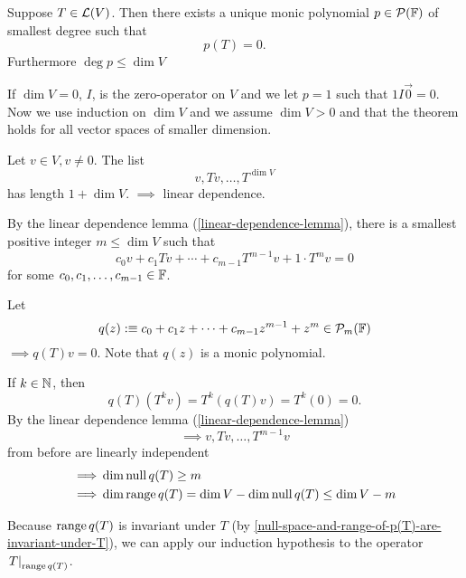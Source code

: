 \begin{thm}
  \label{unique-monic-polynomial-of-smallest-degree}
  Suppose $T\in \mathcal{L}(V)$. Then there exists a unique monic polynomial $p\in \mathcal{P}(\mathbb{F})$ of smallest degree such that 
  \begin{equation}
    p(T)=0. 
  \end{equation}
  Furthermore $\deg p \leq \dim V$
\end{thm}
\begin{prf}
  If $\dim V=0$, $I$, is the zero-operator on $V$ and we let $p=1$ such that $1I\vec0=0$.           Now we use induction on $\dim V$ and we assume $\dim V > 0$ and that the theorem holds for all vector spaces of smaller dimension.
  
  Let $v\in V, v \neq 0$. The list \begin{equation}
    v, Tv, \dots, T^{\dim V}
  \end{equation}
  has length $1+\dim V.$
  $\implies$ linear dependence.

  By the linear dependence lemma (\ref{linear-dependence-lemma}), there is a smallest positive integer $m\leq \dim V$ such that
  \begin{equation}
    c_0 v + c_1 Tv + \cdots + c_{m-1} T^{m-1} v + 1\cdot T^m v = 0
  \end{equation}
  for some $c_0, c_1, \dots, c_{m-1} \in \mathbb{F}$. 

  Let
  \[ q(z) :\equiv c_0 + c_1z + \cdots + c_{m-1} z^{m-1} +z^{m} \in \mathcal{P}_m (\mathbb{F}) \]
  $\implies q(T) v=0$. Note that $q(z)$ is a monic polynomial.

  If $k \in \mathbb{N}$, then
  \begin{equation}
    q(T)(T^kv)=T^k(q(T)v) =T^k (0) =0.
  \end{equation}
  By the linear dependence lemma (\ref{linear-dependence-lemma}) \begin{equation}
    \implies v, Tv, \dots, T^{m-1}v
  \end{equation}
  from before are linearly independent 
  \begin{equation}
    \begin{aligned}
    \implies &\dim \operatorname{null} q(T)   \geq m \\ 
    \implies &\dim \operatorname{range} q(T)  = \dim V - \dim \operatorname{null} q(T) 
                                \leq \dim V - m
    \end{aligned} 
  \end{equation}
  
  Because $\operatorname{range} q(T)$ is invariant under $T$ (by \ref{null-space-and-range-of-p(T)-are-invariant-under-T}), we can apply our induction hypothesis to the operator $\left.T\right|_{\operatorname{range} q(T)}$. 
  

\end{prf}
